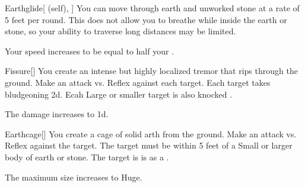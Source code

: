 \lowercase{\hypertarget{spell:Earthglide}{}}\label{spell:Earthglide}
\begin{attuneability}[Rank 5]{\hypertarget{spell:Earthglide}{Earthglide}}[ (self), ]
You can move through earth and unworked stone at a rate of 5 feet per round.
This does not allow you to breathe while inside the earth or stone, so your ability to traverse long distances may be limited.

\rankline
{} Your speed increases to be equal to half your .
\end{attuneability}
\vspace{0.25em}



\lowercase{\hypertarget{spell:Fissure}{}}\label{spell:Fissure}
\begin{freeability}[Rank 5]{\hypertarget{spell:Fissure}{Fissure}}[]
You create an intense but highly localized tremor that rips through the ground.
Make an attack vs. Reflex against each target.
\hit Each target takes bludgeoning  \minus2d.
Ecah Large or smaller target is also knocked .

\rankline
{} The damage increases to  \minus1d.
\end{freeability}
\vspace{0.25em}



\lowercase{\hypertarget{spell:Earthcage}{}}\label{spell:Earthcage}
\begin{freeability}[Rank 6]{\hypertarget{spell:Earthcage}{Earthcage}}[]
You create a cage of solid arth from the ground.
Make an attack vs. Reflex against the target.
The target must be within 5 feet of a Small or larger body of earth or stone.
\hit The target is is  as a .

\rankline
{} The maximum size increases to Huge.
\end{freeability}
\vspace{0.25em}



